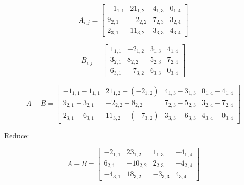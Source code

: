 
\[
\boldsymbol{\mathit{A}}_{i,j} = 
\begin{bmatrix}
    -1_{1,1} & 21_{1,2} & 4_{1,3} & 0_{1,4} \\
    9_{2,1} & -2_{2,2} & 7_{2,3} & 3_{2,4} \\
    2_{3,1} & 11_{3,2} & 3_{3,3} & 4_{3,4}
\end{bmatrix}
\]



\[
\boldsymbol{\mathit{B}}_{i,j} = 
\begin{bmatrix}
    1_{1,1} & -2_{1,2} & 3_{1,3} & 4_{1,4} \\
    3_{2,1} & 8_{2,2} & 5_{2,3} & 7_{2,4} \\
    6_{3,1} & -7_{3,2} & 6_{3,3} & 0_{3,4}
\end{bmatrix}
\]

\[
\boldsymbol{\mathit{A}} - \boldsymbol{\mathit{B}} = 
\begin{bmatrix}
    -1_{1,1} - 1_{1,1} & 21_{1,2} - (-2_{1,2}) & 4_{1,3} - 3_{1,3} & 0_{1,4} - 4_{1,4} \\
    9_{2,1} - 3_{2,1} & -2_{2,2} - 8_{2,2} & 7_{2,3} - 5_{2,3} & 3_{2,4} - 7_{2,4} \\
    2_{3,1} - 6_{3,1} & 11_{3,2} - (-7_{3,2}) & 3_{3,3} - 6_{3,3} & 4_{3,4} - 0_{3,4}
\end{bmatrix}
\]

Reduce:

\[
\boldsymbol{\mathit{A}} - \boldsymbol{\mathit{B}} = 
\begin{bmatrix}
    -2_{1,1} & 23_{1,2} & 1_{1,3} & -4_{1,4} \\
    6_{2,1} & -10_{2,2} & 2_{2,3} & -4_{2,4} \\
    -4_{3,1} & 18_{3,2} & -3_{3,3} & 4_{3,4}
\end{bmatrix}
\]


